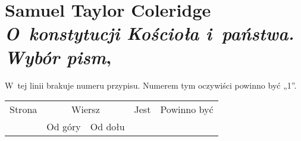 \documentclass[a4paper,11pt]{article}
\numberwithin{equation}{section}
\begin{document}
\VerSpaceTwo


















\section{Samuel Taylor Coleridge \\
  \textit{O~konstytucji Kościoła i~państwa. Wybór pism},
  \parencite{}}


\vspace{0em}



\vspace{0em}


\noindent
{} W~tej linii brakuje numeru przypisu. Numerem tym
oczywiści powinno być „1”.

\VerSpaceFour





\newpage



\begin{center}

  \begin{tabular}{|c|c|c|c|c|}
    \hline
    Strona & \multicolumn{2}{c|}{Wiersz} & Jest
                              & Powinno być \\ \cline{2-3}
    & Od góry & Od dołu & & \\
    \hline
    \hline
  \end{tabular}

\end{center}
\end{document}
